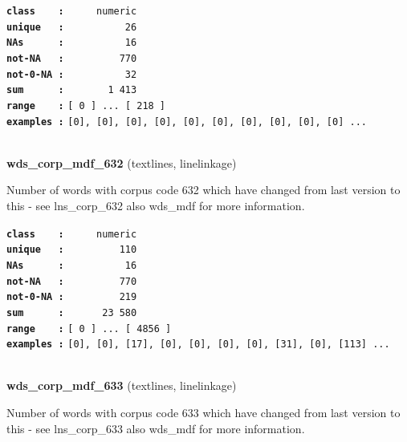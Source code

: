 \documentclass[]{article}
\begin{document}
\textbf{\texttt{class\ \ \ \ :}} \texttt{~~~~~numeric}\\
\textbf{\texttt{unique\ \ \ :}} \texttt{~~~~~~~~~~26}\\
\textbf{\texttt{NAs\ \ \ \ \ \ :}} \texttt{~~~~~~~~~~16}\\
\textbf{\texttt{not-NA\ \ \ :}} \texttt{~~~~~~~~~770}\\
\textbf{\texttt{not-0-NA\ :}} \texttt{~~~~~~~~~~32}\\
\textbf{\texttt{sum\ \ \ \ \ \ :}} \texttt{~~~~~~~1~413}\\
\textbf{\texttt{range\ \ \ \ :}}
\texttt{{[}\ 0\ {]}\ ...\ {[}\ 218\ {]}}\\
\textbf{\texttt{examples\ :}}
\texttt{{[}0{]},\ {[}0{]},\ {[}0{]},\ {[}0{]},\ {[}0{]},\ {[}0{]},\ {[}0{]},\ {[}0{]},\ {[}0{]},\ {[}0{]}\ ...}\\

~

\textbf{wds\_corp\_mdf\_632} (textlines, linelinkage)

Number of words with corpus code 632 which have changed from last
version to this - see lns\_corp\_632 also wds\_mdf for more information.

\textbf{\texttt{class\ \ \ \ :}} \texttt{~~~~~numeric}\\
\textbf{\texttt{unique\ \ \ :}} \texttt{~~~~~~~~~110}\\
\textbf{\texttt{NAs\ \ \ \ \ \ :}} \texttt{~~~~~~~~~~16}\\
\textbf{\texttt{not-NA\ \ \ :}} \texttt{~~~~~~~~~770}\\
\textbf{\texttt{not-0-NA\ :}} \texttt{~~~~~~~~~219}\\
\textbf{\texttt{sum\ \ \ \ \ \ :}} \texttt{~~~~~~23~580}\\
\textbf{\texttt{range\ \ \ \ :}}
\texttt{{[}\ 0\ {]}\ ...\ {[}\ 4856\ {]}}\\
\textbf{\texttt{examples\ :}}
\texttt{{[}0{]},\ {[}0{]},\ {[}17{]},\ {[}0{]},\ {[}0{]},\ {[}0{]},\ {[}0{]},\ {[}31{]},\ {[}0{]},\ {[}113{]}\ ...}\\

~

\textbf{wds\_corp\_mdf\_633} (textlines, linelinkage)

Number of words with corpus code 633 which have changed from last
version to this - see lns\_corp\_633 also wds\_mdf for more information.
\end{document}

